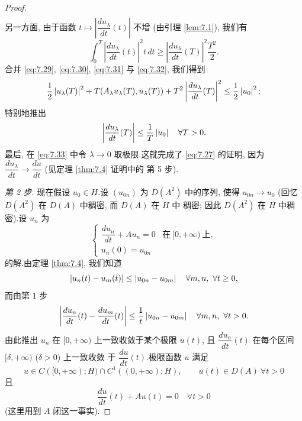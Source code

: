 \begin{proof}
\begin{align}
\end{align}
另一方面, 由于函数 $t\mapsto\left|\dfrac{du_\lambda}{dt}(t)\right|$ 不增
(由引理  \ref{lem:7.1}), 我们有
\begin{equation}
\int_0^T\left|\frac{du_\lambda}{dt}(t)\right|^2t\,dt
\ge\left|\frac{du_\lambda}{dt}(T)\right|^2\frac{T^2}{2}.
\label{eq:7.32}
\end{equation}
合并 \eqref{eq:7.29}, \eqref{eq:7.30}, \eqref{eq:7.31} 与
\eqref{eq:7.32}, 我们得到
\begin{equation*}
\frac12\left|u_\lambda(T)\right|^2+T(A_\lambda u_\lambda(T),u_\lambda(T))
+T^2\left|\frac{du_\lambda}{dt}(T)\right|^2\le\frac12\left|u_0\right|^2;
\end{equation*}
特别地推出
\begin{equation}
\left|\frac{du_\lambda}{dt}(T)\right|\le\frac1T\left|u_0\right|
\quad\forall T>0.
\label{eq:7.33}
\end{equation}
最后, 在 \eqref{eq:7.33} 中令 $\lambda\to0$ 取极限.这就完成了
\eqref{eq:7.27} 的证明, 因为
$\dfrac{du_\lambda}{dt}\to\dfrac{du}{dt}$ (见定理  \ref{thm:7.4} 证明中的
第 5 步).

\emph{第 2 步.} 现在假设 $u_0\in H$.设 $(u_{0n})$ 为 $D(A^2)$ 中的序列,
使得 $u_{0n}\to u_0$ (回忆 $D(A^2)$ 在 $D(A)$ 中稠密, 而 $D(A)$ 在 $H$ 中
稠密; 因此 $D(A^2)$ 在 $H$ 中稠密).设 $u_n$ 为
\begin{equation*}
\begin{cases}
\dfrac{du_n}{dt}+Au_n=0 & \text{在}\ [0,+\infty)\ \text{上},\\
u_n(0)=u_{0n}
\end{cases}
\end{equation*}
的解.由定理  \ref{thm:7.4}, 我们知道
\begin{equation*}
\left|u_n(t)-u_m(t)\right|\le\left|u_{0n}-u_{0m}\right|
\quad\forall m,n,\ \forall t\ge0,
\end{equation*}
而由第 1 步
\begin{equation*}
\left|\frac{du_n}{dt}(t)-\frac{du_m}{dt}(t)\right|
\le\frac1t\left|u_{0n}-u_{0m}\right|\quad\forall m,n,\ \forall t>0.
\end{equation*}
由此推出 $u_n$ 在 $[0,+\infty)$ 上一致收敛于某个极限 $u(t)$, 且
$\dfrac{du_n}{dt}(t)$ 在每个区间 $[\delta,+\infty)$ ($\delta>0$) 上一致收敛
于 $\dfrac{du}{dt}(t)$.极限函数 $u$ 满足
\begin{equation*}
u\in C([0,+\infty);H)\cap C^1((0,+\infty);H),
\qquad u(t)\in D(A)\ \forall t>0
\end{equation*}
且
\begin{equation*}
\frac{du}{dt}(t)+Au(t)=0\quad\forall t>0
\end{equation*}
(这里用到 $A$ 闭这一事实).


\end{proof}
